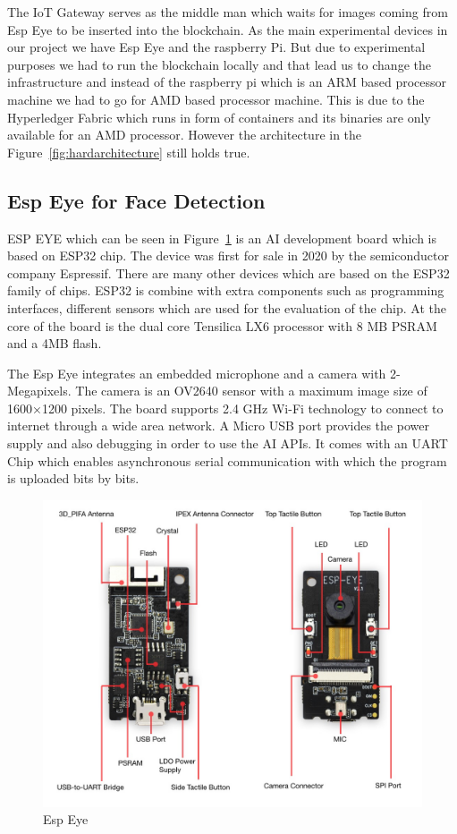 The IoT Gateway serves as the middle man which waits for images coming from Esp Eye to be inserted into the blockchain. As the main experimental devices in our project we have Esp Eye and the raspberry Pi. But due to experimental purposes we had to run the blockchain locally and that lead us to change the infrastructure and instead of the raspberry pi which is an ARM based processor machine we had to go for AMD based processor machine. This is due to the Hyperledger Fabric which runs in form of containers and its binaries are only available for an AMD processor. However the architecture in the Figure~\ref{fig:hardarchitecture} still holds true. 


\subsection{Esp Eye for Face Detection}

ESP EYE which can be seen in Figure~\ref{fig:espeye} is an AI development board which is based on ESP32 chip. The device was first for sale in 2020 by the semiconductor company Espressif. There are many other devices which are based on the ESP32 family of chips. ESP32 is combine with extra components such as programming interfaces, different sensors which are used for the evaluation of the chip. 
At the core of the board is the dual core Tensilica LX6 processor with 8 MB PSRAM and a 4MB flash. 

The Esp Eye integrates an embedded microphone and a camera with 2-Megapixels. The camera is an OV2640 sensor with a maximum image size of 1600×1200 pixels. The board supports  2.4 GHz Wi-Fi technology to connect to internet through a wide area network. A Micro USB port provides the power supply and also debugging in order to use the AI APIs. It comes with an UART Chip which enables asynchronous serial communication with which the program is uploaded bits by bits. 
\begin{figure}[!htb]
    \centering
    \includegraphics[width=1\textwidth]{figures/espeye.png}
    \caption{Esp Eye}
    \label{fig:espeye}
\end{figure}


